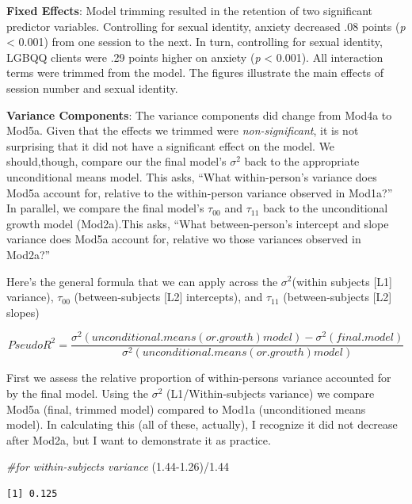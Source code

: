\documentclass[
  english,
]{book}
\newenvironment{Shaded}{\begin{snugshade}}{\end{snugshade}}
\newcommand{\CommentTok}[1]{\textcolor[rgb]{0.56,0.35,0.01}{\textit{#1}}}
\newcommand{\FloatTok}[1]{\textcolor[rgb]{0.00,0.00,0.81}{#1}}
\newcommand{\NormalTok}[1]{#1}
\newcommand{\SpecialCharTok}[1]{\textcolor[rgb]{0.00,0.00,0.00}{#1}}
\begin{document}
\textbf{Fixed Effects}: Model trimming resulted in the retention of two significant predictor variables. Controlling for sexual identity, anxiety decreased .08 points (\emph{p} \textless{} 0.001) from one session to the next. In turn, controlling for sexual identity, LGBQQ clients were .29 points higher on anxiety (\emph{p} \textless{} 0.001). All interaction terms were trimmed from the model. The figures illustrate the main effects of session number and sexual identity.

\textbf{Variance Components}: The variance components did change from Mod4a to Mod5a. Given that the effects we trimmed were \emph{non-significant}, it is not surprising that it did not have a significant effect on the model. We should,though, compare our the final model's \(\sigma ^{2}\) back to the appropriate unconditional means model. This asks, ``What within-person's variance does Mod5a account for, relative to the within-person variance observed in Mod1a?'' In parallel, we compare the final model's \(\tau _{00}\) and \(\tau _{11}\) back to the unconditional growth model (Mod2a).This asks, ``What between-person's intercept and slope variance does Mod5a account for, relative wo those variances observed in Mod2a?''

Here's the general formula that we can apply across the \(\sigma ^{2}\)(within subjects {[}L1{]} variance), \(\tau _{00}\) (between-subjects {[}L2{]} intercepts), and \(\tau _{11}\) (between-subjects {[}L2{]} slopes)

\[Pseudo R^{2} = \frac{\sigma^2 (unconditional. means(or.growth)model) - \sigma^2(final. model)}{\sigma^{2}(unconditional.means(or.growth)model)}\]

First we assess the relative proportion of within-persons variance accounted for by the final model. Using the \(\sigma ^{2}\) (L1/Within-subjects variance) we compare Mod5a (final, trimmed model) compared to Mod1a (unconditioned means model). In calculating this (all of these, actually), I recognize it did not decrease after Mod2a, but I want to demonstrate it as practice.

\begin{Shaded}
\begin{Highlighting}[]
\CommentTok{\#for within{-}subjects variance}
\NormalTok{(}\FloatTok{1.44{-}1.26}\NormalTok{)}\SpecialCharTok{/}\FloatTok{1.44}
\end{Highlighting}
\end{Shaded}

\begin{verbatim}
[1] 0.125
\end{verbatim}
\end{document}
